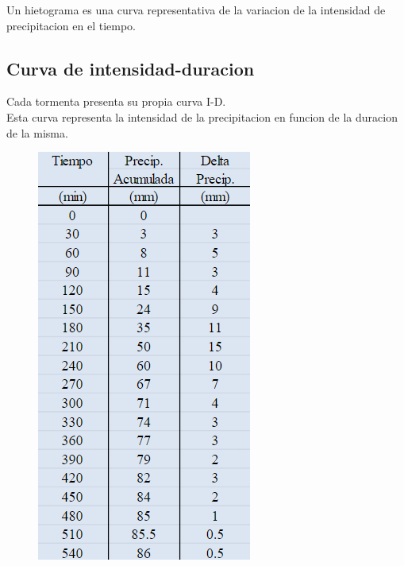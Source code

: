 Un hietograma es una curva representativa de la variacion de la intensidad de precipitacion en el tiempo.

\newpage
\subsection{Curva de intensidad-duracion}

Cada tormenta presenta su propia curva I-D.\\
Esta curva representa la intensidad de la precipitacion en funcion de la duracion de la misma.\\

\begin{figure}[!htbp]
    \centering
    \begin{minipage}{0.15\textwidth} 
        \centering
        \includegraphics[width=\textwidth]{imagenes/datos_i_d.png}

\end{minipage}
\end{figure}
